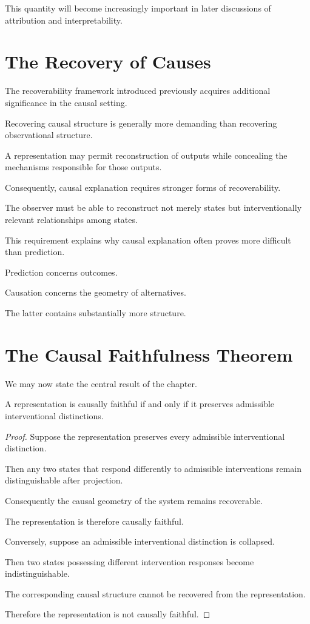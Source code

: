\documentclass[11pt,oneside,openany]{book}
\begin{document}
This quantity will become increasingly important in later discussions of attribution and interpretability.

\section{The Recovery of Causes}

The recoverability framework introduced previously acquires additional significance in the causal setting.

Recovering causal structure is generally more demanding than recovering observational structure.

A representation may permit reconstruction of outputs while concealing the mechanisms responsible for those outputs.

Consequently, causal explanation requires stronger forms of recoverability.

The observer must be able to reconstruct not merely states but interventionally relevant relationships among states.

This requirement explains why causal explanation often proves more difficult than prediction.

Prediction concerns outcomes.

Causation concerns the geometry of alternatives.

The latter contains substantially more structure.

\section{The Causal Faithfulness Theorem}

We may now state the central result of the chapter.

\begin{theorem}

A representation is causally faithful if and only if it preserves admissible interventional distinctions.

\end{theorem}

\begin{proof}

Suppose the representation preserves every admissible interventional distinction.

Then any two states that respond differently to admissible interventions remain distinguishable after projection.

Consequently the causal geometry of the system remains recoverable.

The representation is therefore causally faithful.

Conversely, suppose an admissible interventional distinction is collapsed.

Then two states possessing different intervention responses become indistinguishable.

The corresponding causal structure cannot be recovered from the representation.

Therefore the representation is not causally faithful.

\end{proof}
\end{document}
